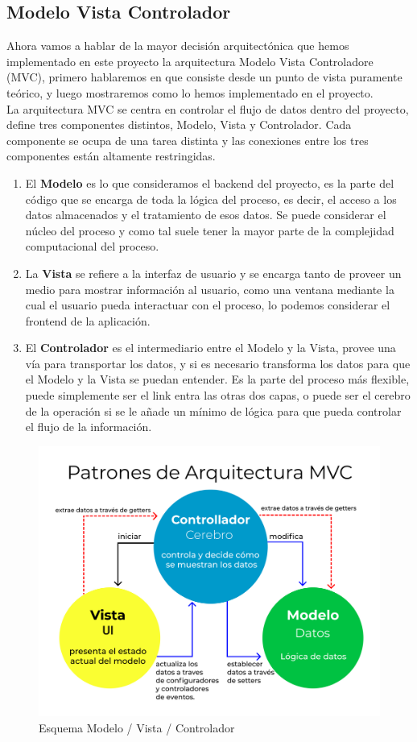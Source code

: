 \documentclass[12pt,a4paper]{article}
\begin{document}
	\subsection{Modelo Vista Controlador}
	Ahora vamos a hablar de la mayor decisión arquitectónica que hemos implementado en este proyecto la arquitectura Modelo Vista Controladore (MVC), primero hablaremos en que consiste desde un punto de vista puramente teórico, y luego mostraremos como lo hemos implementado en el proyecto.\\
	La arquitectura MVC se centra en controlar el flujo de datos dentro del proyecto, define tres componentes distintos, Modelo, Vista y Controlador. Cada componente se ocupa de una tarea distinta y las conexiones entre los tres componentes están altamente restringidas.
	\begin{enumerate}
	\item El \textbf{Modelo} es lo que consideramos el backend del proyecto, es la parte del código que se encarga de toda la lógica del proceso, es decir, el acceso a los datos almacenados y el tratamiento de esos datos. Se puede considerar el núcleo del proceso y como tal suele tener la mayor parte de la complejidad computacional del proceso.
	\item La \textbf{Vista} se refiere a la interfaz de usuario y se encarga tanto de proveer un medio para mostrar información al usuario, como una ventana mediante la cual el usuario pueda interactuar con el proceso, lo podemos considerar el frontend de la aplicación.
	\item El \textbf{Controlador} es el intermediario entre el Modelo y la Vista, provee una vía para transportar los datos, y si es necesario transforma los datos para que el Modelo y la Vista se puedan entender. Es la parte del proceso más flexible, puede simplemente ser el link entra las otras dos capas, o puede ser el cerebro de la operación si se le añade un mínimo de lógica para que pueda controlar el flujo de la información.
	\end{enumerate}
\begin{figure}[H]
\centering
  \centering
  \includegraphics[width=1\linewidth]{MVC3}
\caption{Esquema Modelo / Vista / Controlador}
\label{fig:subrgrafo}
\end{figure}
\end{document}
